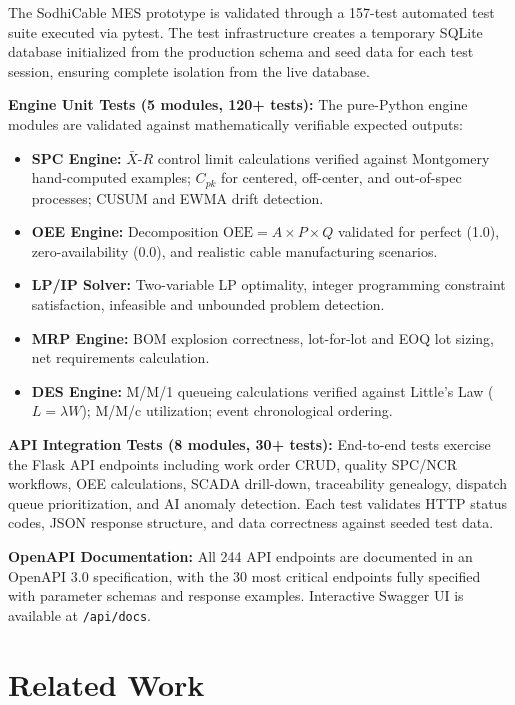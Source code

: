 \documentclass[11pt]{article}
\begin{document}
The SodhiCable MES prototype is validated through a 157-test automated test suite executed via pytest.  The test infrastructure creates a temporary SQLite database initialized from the production schema and seed data for each test session, ensuring complete isolation from the live database.

\textbf{Engine Unit Tests (5 modules, 120+ tests):} The pure-Python engine modules are validated against mathematically verifiable expected outputs:
\begin{itemize}[leftmargin=2em, itemsep=1pt]
\item \textbf{SPC Engine:} $\bar{X}$-$R$ control limit calculations verified against Montgomery~\cite{montgomery2019} hand-computed examples; $C_{pk}$ for centered, off-center, and out-of-spec processes; CUSUM and EWMA drift detection.
\item \textbf{OEE Engine:} Decomposition $\text{OEE} = A \times P \times Q$ validated for perfect (1.0), zero-availability (0.0), and realistic cable manufacturing scenarios.
\item \textbf{LP/IP Solver:} Two-variable LP optimality, integer programming constraint satisfaction, infeasible and unbounded problem detection.
\item \textbf{MRP Engine:} BOM explosion correctness, lot-for-lot and EOQ lot sizing, net requirements calculation.
\item \textbf{DES Engine:} M/M/1 queueing calculations verified against Little's Law ($L = \lambda W$); M/M/c utilization; event chronological ordering.
\end{itemize}

\textbf{API Integration Tests (8 modules, 30+ tests):} End-to-end tests exercise the Flask API endpoints including work order CRUD, quality SPC/NCR workflows, OEE calculations, SCADA drill-down, traceability genealogy, dispatch queue prioritization, and AI anomaly detection.  Each test validates HTTP status codes, JSON response structure, and data correctness against seeded test data.

\textbf{OpenAPI Documentation:} All 244 API endpoints are documented in an OpenAPI 3.0 specification, with the 30 most critical endpoints fully specified with parameter schemas and response examples.  Interactive Swagger UI is available at \texttt{/api/docs}.


\section{Related Work}\label{sec:related}
\end{document}
